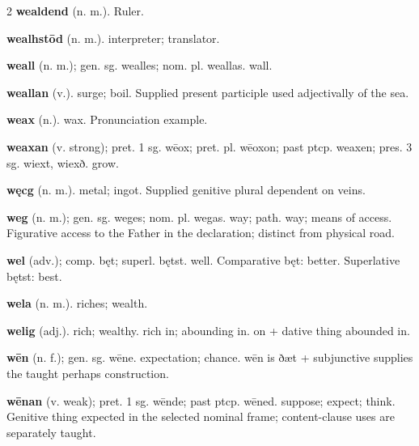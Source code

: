 \begin{multicols*}{2}
\textbf{wealdend} (n. m.). Ruler.\par
\textbf{wealhstōd} (n. m.). interpreter; translator.\par
\textbf{weall} (n. m.); gen. sg. wealles; nom. pl. weallas. wall.\par
\textbf{weallan} (v.). surge; boil. Supplied present participle used adjectivally of the sea.\par
\textbf{weax} (n.). wax. Pronunciation example.\par
\textbf{weaxan} (v. strong); pret. 1 sg. wēox; pret. pl. wēoxon; past ptcp. weaxen; pres. 3 sg. wiext, wiexð. grow.\par
\textbf{węcg} (n. m.). metal; ingot. Supplied genitive plural dependent on veins.\par
\textbf{weg} (n. m.); gen. sg. weges; nom. pl. wegas. way; path. way; means of access. Figurative access to the Father in the declaration; distinct from physical road.\par
\textbf{wel} (adv.); comp. bęt; superl. bętst. well. Comparative bęt: better. Superlative bętst: best.\par
\textbf{wela} (n. m.). riches; wealth.\par
\textbf{welig} (adj.). rich; wealthy. rich in; abounding in. on + dative thing abounded in.\par
\textbf{wēn} (n. f.); gen. sg. wēne. expectation; chance. wēn is ðæt + subjunctive supplies the taught perhaps construction.\par
\textbf{wēnan} (v. weak); pret. 1 sg. wēnde; past ptcp. wēned. suppose; expect; think. Genitive thing expected in the selected nominal frame; content-clause uses are separately taught.\par

\end{multicols*}
